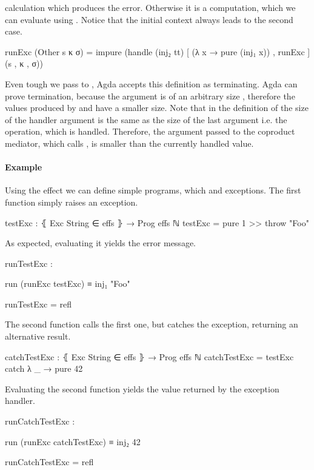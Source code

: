 calculation which produces the error.
Otherwise it is a computation, which we can evaluate using .
Notice that the initial context always leads to the second case.
\begin{code}
runExc (Other s κ σ) = impure (handle (inj₂ tt) [ (λ x → pure (inj₁ x)) , runExc ] (s , κ , σ))
\end{code}
Even tough we pass  to , Agda accepts this
definition as terminating.
Agda can prove termination, because the argument is of an arbitrary size
, therefore the values produced by  and
 have a smaller size.
Note that in the definition of  the size of the handler
argument is the same as the size of the last argument i.e. the operation, which
is handled.
Therefore, the argument passed to the coproduct mediator, which calls
, is smaller than the currently handled value.

\paragraph{Example}
Using the  effect we can define simple programs, which
 and  exceptions.
The first function simply raises an exception.
\begin{code}
testExc : ⦃ Exc String ∈ effs ⦄ → Prog effs ℕ
testExc = pure 1 >> throw "Foo"
\end{code}
As expected, evaluating it yields the error message.
\begin{center}
\begin{code}
runTestExc :
\end{code}
\begin{code}[inline]
 run (runExc testExc) ≡ inj₁ "Foo"
\end{code}
\begin{code}
runTestExc = refl
\end{code}
\end{center}
The second function calls the first one, but catches the exception, returning an
alternative result.
\begin{code}
catchTestExc : ⦃ Exc String ∈ effs ⦄ → Prog effs ℕ
catchTestExc = testExc catch λ _ → pure 42
\end{code}
Evaluating the second function yields the value returned by the exception
handler.
\begin{center}
\begin{code}
runCatchTestExc :
\end{code}
\begin{code}[inline]
 run (runExc catchTestExc) ≡ inj₂ 42
\end{code}
\begin{code}
runCatchTestExc = refl
\end{code}
\end{center}


